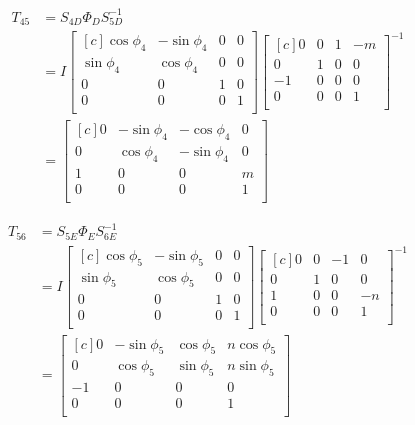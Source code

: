 \documentclass[onecolumn,10pt]{jhwhw}
\begin{document}
\begin{align*}
T_{45} &= S_{4D} \Phi_D S_{5D}^{-1} \\
&= I 
\begin{bmatrix*}[c]
\cos \phi_4 & -\sin \phi_4 & 0 & 0 \\
\sin \phi_4 &  \cos \phi_4 & 0 & 0 \\
          0 &            0 & 1 & 0 \\
          0 &            0 & 0 & 1 \\
\end{bmatrix*}
\begin{bmatrix*}[c]
0 & 0 & 1 & -m \\
0 & 1 & 0 & 0 \\
-1 & 0 & 0 & 0 \\
0 & 0 & 0 & 1 \\
\end{bmatrix*}^{-1} \\
&= 
\begin{bmatrix*}[c]
0 & -\sin \phi_4 & -\cos \phi_4 & 0 \\
0 &  \cos \phi_4 & -\sin \phi_4 & 0 \\
1 &          0 &          0 & m \\
0 &          0 &          0 & 1 \\
\end{bmatrix*}
\end{align*}

\begin{align*}
T_{56} &= S_{5E} \Phi_E S_{6E}^{-1} \\
&= I 
\begin{bmatrix*}[c]
\cos \phi_5 & -\sin \phi_5 & 0 & 0 \\
\sin \phi_5 &  \cos \phi_5 & 0 & 0 \\
          0 &            0 & 1 & 0 \\
          0 &            0 & 0 & 1 \\
\end{bmatrix*}
\begin{bmatrix*}[c]
0 & 0 & -1 & 0 \\
0 & 1 & 0 & 0 \\
1 & 0 & 0 & -n \\
0 & 0 & 0 & 1 \\
\end{bmatrix*}^{-1} \\
&= 
\begin{bmatrix*}[c]
 0 & -\sin \phi_5 & \cos \phi_5 & n \cos \phi_5 \\
 0 &  \cos \phi_5 & \sin \phi_5 & n \sin \phi_5 \\
-1 &          0 &         0 &           0 \\
 0 &          0 &         0 &           1 \\
\end{bmatrix*}
\end{align*}
\end{document}
